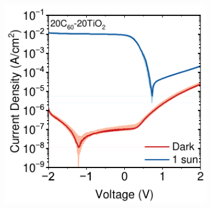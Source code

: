 \begin{figure}[htbp]
\begin{subfigure}[b]{0.32\textwidth}
        \caption{}
    \end{subfigure}
    \hfill
    \begin{subfigure}[b]{0.32\textwidth}
        \centering
        \includegraphics[width=\textwidth]{chapters/transport_layers/images/JV_Median_20_20.pdf}
        \caption{}
    \end{subfigure}

    \vspace{1em} %


\end{figure}
